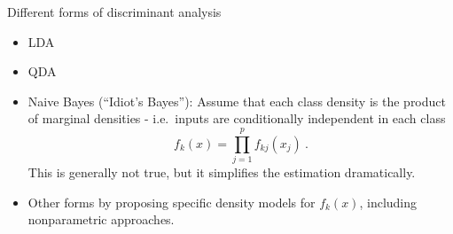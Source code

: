 \documentclass[
  10pt,
  ignorenonframetext,
]{beamer}
\providecommand{\tightlist}{%
  \setlength{\itemsep}{0pt}\setlength{\parskip}{0pt}}
\begin{document}
\begin{frame}
\begin{block}{Different forms of discriminant analysis}
\protect\hypertarget{different-forms-of-discriminant-analysis}{}
\(~\)

\begin{itemize}
\tightlist
\item
  LDA
\end{itemize}

\vspace{2mm}

\begin{itemize}
\tightlist
\item
  QDA
\end{itemize}

\vspace{2mm}

\begin{itemize}
\tightlist
\item
  Naive Bayes (``Idiot's Bayes''): Assume that each class density is the
  product of marginal densities - i.e.~inputs are conditionally
  independent in each class \[f_k(x)=\prod_{j=1}^p f_{kj}(x_j) \ .\]
  This is generally not true, but it simplifies the estimation
  dramatically.
\end{itemize}

\vspace{2mm}

\begin{itemize}
\tightlist
\item
  Other forms by proposing specific density models for \(f_k(x)\),
  including nonparametric approaches.
\end{itemize}
\end{block}
\end{frame}
\end{document}
